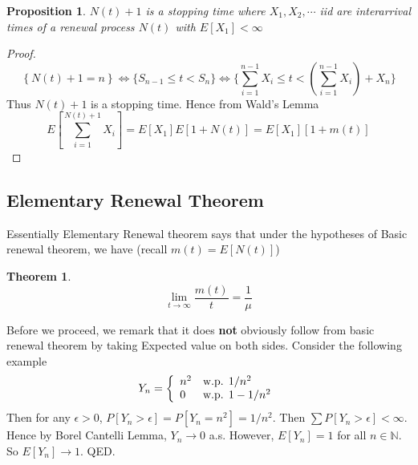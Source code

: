 \documentclass[a4paper,10pt]{article}
\newtheorem{prop}{Proposition}
\newtheorem{theo}{Theorem}
\begin{document}
\begin{prop}
$N(t)+1$ is a stopping time where $X_1,X_2,\cdots$ iid are interarrival times of a renewal process $N(t)$ with $E[X_1] < \infty$
\end{prop}
\begin{proof}
\[
\left\{N(t) + 1 = n \right\} \iff \{S_{n-1} \leq t < S_n\} \iff \{\sum_{i=1}^{n-1} X_i \leq t < (\sum_{i=1}^{n-1} X_i) + X_n\}  \]
Thus $N(t)+1$ is a stopping time. Hence from Wald's Lemma
\[ E\left[\sum_{i=1}^{N(t)+1}X_i\right] = E[X_1]E[1 + N(t)] = E[X_1][1+m(t)]\]
\end{proof}

\subsection{Elementary Renewal Theorem}
Essentially Elementary Renewal theorem says that under the hypotheses of Basic renewal theorem, we have (recall $m(t) = E[N(t)]$)
\begin{theo}
\[\lim_{t \to \infty}\frac{m(t)}{t} = \frac{1}{\mu}\]
\end{theo}
Before we proceed, we remark that it does \textbf{not} obviously follow from basic renewal theorem by taking Expected value on both sides. Consider the following example
\[
Y_n = \left\{ \begin{array}{l l}
n^2 & \mbox{w.p.  } 1/n^2 \\
0 & \mbox{w.p.  } 1- 1/n^2
\end{array} \right.
\]
Then for any $\epsilon > 0$, $P[Y_n > \epsilon] = P[Y_n = n^2] = 1/n^2$. Then $\sum P[Y_n > \epsilon] < \infty$. Hence by Borel Cantelli Lemma, $Y_n \to 0$ a.s. However, $E[Y_n] = 1$ for all $n \in \mathbb{N}$. So $E[Y_n] \to 1$. QED.
\end{document}
